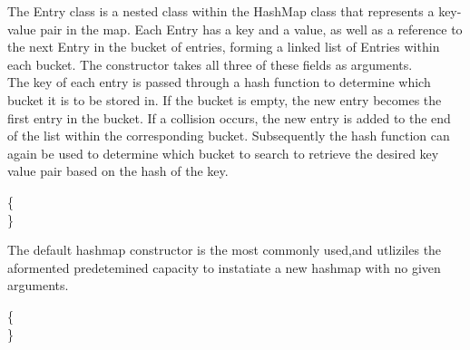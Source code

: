 \documentclass[a4paper]{article}
\begin{document}
The Entry class is a nested class within the HashMap class that represents a key-value pair in the map.
Each Entry has a key and a value, as well as a reference to the next Entry in the bucket of entries,
forming a linked list of Entries within each bucket.
The constructor takes all three of these fields as arguments. \\

The key of each entry is passed through a hash function to determine which bucket it is to be stored in.
If the bucket is empty, the new entry becomes the first entry in the bucket.
If a collision occurs, the new entry is added to the end of the list within the corresponding bucket.
Subsequently the hash function can again be used to determine which bucket to search 
to retrieve the desired key value pair based on the hash of the key.







\vspace{4mm}
\makeatletter
\renewcommand{\ALG@name}{Hashmap Constructor}
\makeatother
\setcounter{algorithm}{0}

\begin{algorithm}
\caption{}\label{euclid}
\begin{algorithmic}[1]

\algrenewcommand{}
 {\{}
 \\
{\}}
\EndProcedure
\end{algorithmic}
\end{algorithm}

The default hashmap constructor is the most commonly used,and utliziles the aformented 
predetemined capacity to instatiate a new hashmap with no given arguments.



\vspace{4mm}
\makeatletter
\renewcommand{\ALG@name}{Hashmap Constructor}
\makeatother

\begin{algorithm}
\caption{}\label{euclid}
\begin{algorithmic}[1]

\algrenewcommand{}
 {\{}
 \\
{\}}
\EndProcedure
\end{algorithmic}
\end{algorithm}
\end{document}
